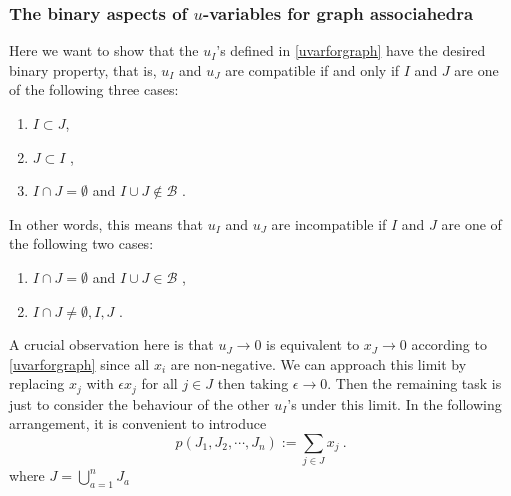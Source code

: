 \documentclass[hidelinks,12pt]{article}
\begin{document}
\subsubsection{The binary aspects of $u$-variables for graph associahedra}

Here we want to show that the $u_{I}$'s defined in \eqref{uvarforgraph} have the desired binary property, that is, $u_{I}$ and $u_{J}$ are compatible if and only if $I$ and $J$ are one of the following three cases:
\begin{enumerate}
   \item $I\subset J$\:,
   \item $J\subset I$ \:,
   \item $I\cap J=\emptyset$ and $I\cup J \notin \mathcal{B}$ \:.
\end{enumerate}
In other words, this means that $u_{I}$ and $u_{J}$ are incompatible if $I$ and $J$ are one of the following two cases:
\begin{enumerate}[resume]
   \item $I\cap J=\emptyset$ and $I\cup J \in \mathcal{B}$ \:, 
   \item $I\cap J \neq \emptyset,I, J $ \:.
\end{enumerate}

A crucial observation here is that $u_{J}\to 0$ is equivalent to $x_{J}\to 0 $ according to \eqref{uvarforgraph} since all $x_{i}$ are non-negative. We can approach this limit by replacing $x_{j}$ with $ \epsilon x_{j}$ for all $j\in J$ then taking $\epsilon \to 0$. Then the remaining task is just to consider the behaviour of the other $u_{I}$'s under this limit. In the following arrangement, it is convenient to introduce 
\begin{equation}
  p(J_{1},J_{2},\cdots,J_{n}):= \sum_{j\in J } x_{j} \:.
\end{equation}
where $J= \bigcup_{a=1}^{n} J_{a}$
\end{document}
